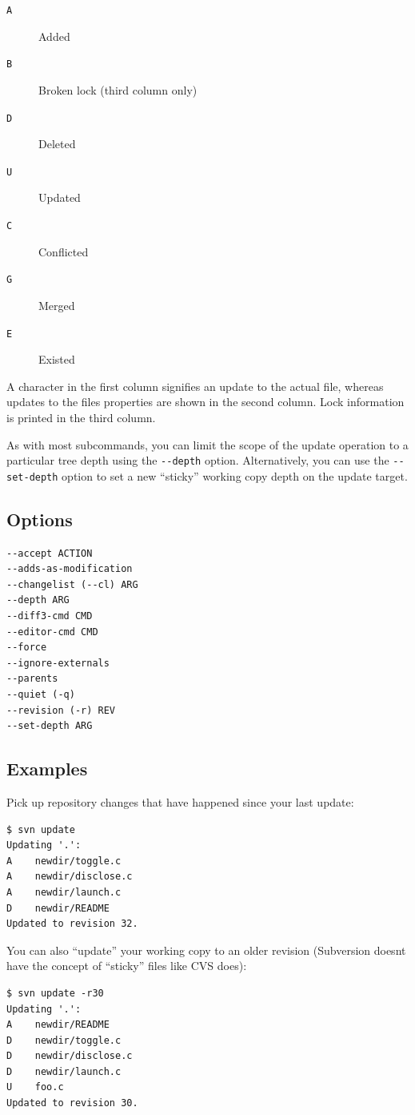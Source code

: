 \begin{description}
\item[\texttt{A}]
Added
\item[\texttt{B}]
Broken lock (third column only)
\item[\texttt{D}]
Deleted
\item[\texttt{U}]
Updated
\item[\texttt{C}]
Conflicted
\item[\texttt{G}]
Merged
\item[\texttt{E}]
Existed
\end{description}

A character in the first column signifies an update to the actual file,
whereas updates to the file\textquotesingle s properties are shown in
the second column. Lock information is printed in the third column.

As with most subcommands, you can limit the scope of the update
operation to a particular tree depth using the \texttt{-\/-depth}
option. Alternatively, you can use the \texttt{-\/-set-depth} option to
set a new ``sticky'' working copy depth on the update target.

\subsection{Options}

\begin{verbatim}
--accept ACTION
--adds-as-modification
--changelist (--cl) ARG
--depth ARG
--diff3-cmd CMD
--editor-cmd CMD
--force
--ignore-externals
--parents
--quiet (-q)
--revision (-r) REV
--set-depth ARG
\end{verbatim}

\subsection{Examples}

Pick up repository changes that have happened since your last update:

\begin{verbatim}
$ svn update
Updating '.':
A    newdir/toggle.c
A    newdir/disclose.c
A    newdir/launch.c
D    newdir/README
Updated to revision 32.
\end{verbatim}

You can also ``update'' your working copy to an older revision
(Subversion doesn\textquotesingle t have the concept of ``sticky'' files
like CVS does):

\begin{verbatim}
$ svn update -r30
Updating '.':
A    newdir/README
D    newdir/toggle.c
D    newdir/disclose.c
D    newdir/launch.c
U    foo.c
Updated to revision 30.
\end{verbatim}


